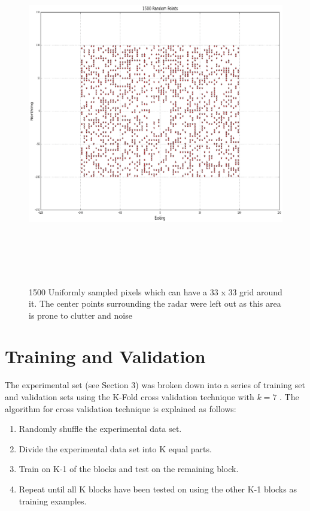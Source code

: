 \documentclass[proposal]{umassthesis}
\begin{document}
\begin{figure}[!h]
\begin{center}
\includegraphics[width = 15cm,height = 15cm]{random_pixels_1500.eps}
\caption{1500 Uniformly sampled pixels which can have a 33 x 33 grid around it. The center points surrounding the radar were left out as this area is prone to clutter and noise}
\label{fig:1500_pixels}
\end{center}
\end{figure}

\section{Training and Validation}

The experimental set (see Section 3) was broken down into a series of training set and validation sets using the K-Fold cross validation technique with $k=7$ \cite{friedman2001elements}. The algorithm for cross validation technique is explained as follows:
 
\begin{enumerate}
\item Randomly shuffle the experimental data set. 
\item Divide the experimental data set into K equal parts.
\item Train on K-1 of the blocks and test on the remaining block. 
\item Repeat until all K blocks have been tested on using the other K-1 blocks as training examples. 
\end{enumerate}
\end{document}
